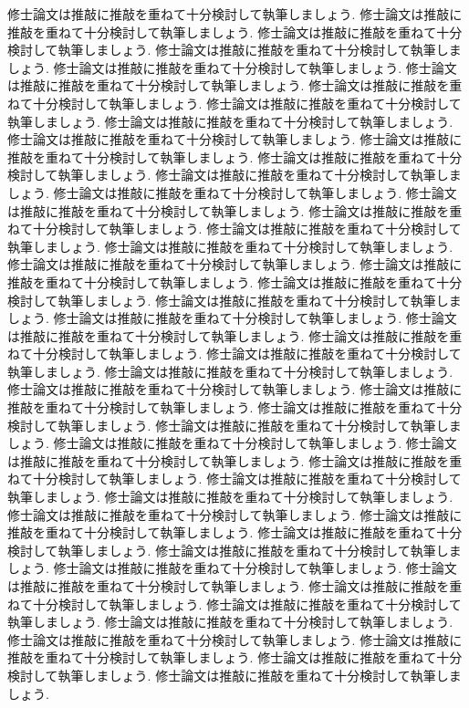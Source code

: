 \documentclass[12pt,a4j,twoside]{jreport}
\numberwithin{equation}{chapter}
\theoremstyle{definition} %
\begin{document}
修士論文は推敲に推敲を重ねて十分検討して執筆しましょう. 
修士論文は推敲に推敲を重ねて十分検討して執筆しましょう. 
修士論文は推敲に推敲を重ねて十分検討して執筆しましょう. 
修士論文は推敲に推敲を重ねて十分検討して執筆しましょう. 
修士論文は推敲に推敲を重ねて十分検討して執筆しましょう. 
修士論文は推敲に推敲を重ねて十分検討して執筆しましょう. 
修士論文は推敲に推敲を重ねて十分検討して執筆しましょう. 
修士論文は推敲に推敲を重ねて十分検討して執筆しましょう. 
修士論文は推敲に推敲を重ねて十分検討して執筆しましょう. 
修士論文は推敲に推敲を重ねて十分検討して執筆しましょう. 
修士論文は推敲に推敲を重ねて十分検討して執筆しましょう. 
修士論文は推敲に推敲を重ねて十分検討して執筆しましょう. 
修士論文は推敲に推敲を重ねて十分検討して執筆しましょう. 
修士論文は推敲に推敲を重ねて十分検討して執筆しましょう. 
修士論文は推敲に推敲を重ねて十分検討して執筆しましょう. 
修士論文は推敲に推敲を重ねて十分検討して執筆しましょう. 
修士論文は推敲に推敲を重ねて十分検討して執筆しましょう. 
修士論文は推敲に推敲を重ねて十分検討して執筆しましょう. 
修士論文は推敲に推敲を重ねて十分検討して執筆しましょう. 
修士論文は推敲に推敲を重ねて十分検討して執筆しましょう. 
修士論文は推敲に推敲を重ねて十分検討して執筆しましょう. 
修士論文は推敲に推敲を重ねて十分検討して執筆しましょう. 
修士論文は推敲に推敲を重ねて十分検討して執筆しましょう. 
修士論文は推敲に推敲を重ねて十分検討して執筆しましょう. 
修士論文は推敲に推敲を重ねて十分検討して執筆しましょう. 
修士論文は推敲に推敲を重ねて十分検討して執筆しましょう. 
修士論文は推敲に推敲を重ねて十分検討して執筆しましょう. 
修士論文は推敲に推敲を重ねて十分検討して執筆しましょう. 
修士論文は推敲に推敲を重ねて十分検討して執筆しましょう. 
修士論文は推敲に推敲を重ねて十分検討して執筆しましょう. 
修士論文は推敲に推敲を重ねて十分検討して執筆しましょう. 
修士論文は推敲に推敲を重ねて十分検討して執筆しましょう. 
修士論文は推敲に推敲を重ねて十分検討して執筆しましょう. 
修士論文は推敲に推敲を重ねて十分検討して執筆しましょう. 
修士論文は推敲に推敲を重ねて十分検討して執筆しましょう. 
修士論文は推敲に推敲を重ねて十分検討して執筆しましょう. 
修士論文は推敲に推敲を重ねて十分検討して執筆しましょう. 
修士論文は推敲に推敲を重ねて十分検討して執筆しましょう. 
修士論文は推敲に推敲を重ねて十分検討して執筆しましょう. 
修士論文は推敲に推敲を重ねて十分検討して執筆しましょう. 
修士論文は推敲に推敲を重ねて十分検討して執筆しましょう. 
修士論文は推敲に推敲を重ねて十分検討して執筆しましょう. 
修士論文は推敲に推敲を重ねて十分検討して執筆しましょう. 
修士論文は推敲に推敲を重ねて十分検討して執筆しましょう. 
修士論文は推敲に推敲を重ねて十分検討して執筆しましょう. 
修士論文は推敲に推敲を重ねて十分検討して執筆しましょう. 
修士論文は推敲に推敲を重ねて十分検討して執筆しましょう. 
修士論文は推敲に推敲を重ねて十分検討して執筆しましょう. 
修士論文は推敲に推敲を重ねて十分検討して執筆しましょう. 
\end{document}
